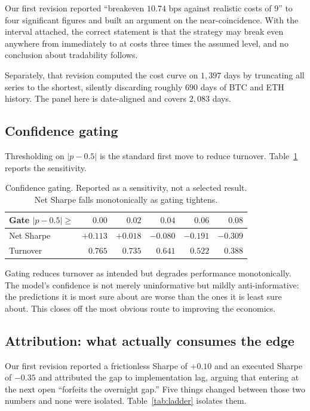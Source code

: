 \documentclass[preprint,12pt,authoryear]{elsarticle}
\begin{document}
Our first revision reported ``breakeven $10.74$ bps against realistic costs of
$9$'' to four significant figures and built an argument on the near-coincidence.
With the interval attached, the correct statement is that the strategy may break
even anywhere from immediately to at costs three times the assumed level, and no
conclusion about tradability follows.

Separately, that revision computed the cost curve on $1{,}397$ days by truncating
all series to the shortest, silently discarding roughly $690$ days of BTC and ETH
history. The panel here is date-aligned and covers $2{,}083$ days.

\subsection{Confidence gating}

Thresholding on $|p - 0.5|$ is the standard first move to reduce turnover.
Table~\ref{tab:gate} reports the sensitivity.

\begin{table}[t]\centering\small
\caption{Confidence gating. Reported as a sensitivity, not a selected result.
Net Sharpe falls monotonically as gating tightens.}
\label{tab:gate}
\begin{tabular}{@{}lrrrrr@{}}
\toprule
Gate $|p - 0.5| \ge$ & $0.00$ & $0.02$ & $0.04$ & $0.06$ & $0.08$ \\
\midrule
Net Sharpe & $+0.113$ & $+0.018$ & $-0.080$ & $-0.191$ & $-0.309$ \\
Turnover   & $0.765$ & $0.735$ & $0.641$ & $0.522$ & $0.388$ \\
\bottomrule
\end{tabular}
\end{table}

Gating reduces turnover as intended but degrades performance monotonically. The
model's confidence is not merely uninformative but mildly anti-informative: the
predictions it is most sure about are worse than the ones it is least sure about.
This closes off the most obvious route to improving the economics.

\subsection{Attribution: what actually consumes the edge}
\label{ssec:ladder}

Our first revision reported a frictionless Sharpe of $+0.10$ and an executed
Sharpe of $-0.35$ and attributed the gap to implementation lag, arguing that
entering at the next open ``forfeits the overnight gap.'' Five things changed
between those two numbers and none were isolated. Table~\ref{tab:ladder}
isolates them.
\end{document}
